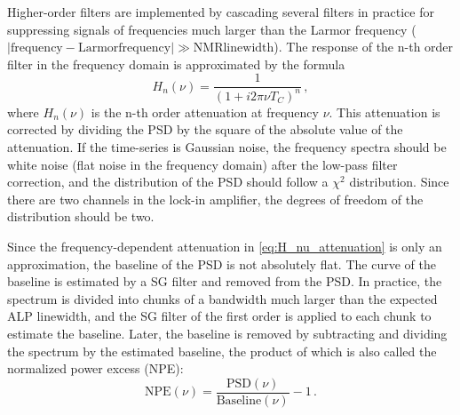 Higher-order filters are implemented by cascading several filters in practice for suppressing signals of frequencies much larger than the Larmor frequency ($|\mathrm{frequency}-\mathrm{Larmor frequency}|\gg\mathrm{NMR linewidth}$).   
The response of the n-th order filter in the frequency domain is approximated by the formula
\begin{equation}
    H_n(\nu)=\frac{1}{(1+i2\pi\nu T_C)^n} \,,
    \label{eq:H_nu_attenuation}
\end{equation}
where $H_n(\nu)$ is the n-th order attenuation at frequency $\nu$. 
This attenuation is corrected by dividing the PSD by the square of the absolute value of the attenuation.
If the time-series is Gaussian noise, the frequency spectra should be white noise (flat noise in the frequency domain) after the low-pass filter correction, and the distribution of the PSD should follow a $\chi^2$ distribution. Since there are two channels in the lock-in amplifier, the degrees of freedom of the distribution should be two.

Since the frequency-dependent attenuation in \eqref{eq:H_nu_attenuation} is only an approximation, the baseline of the PSD is not absolutely flat. 
The curve of the baseline is estimated by a SG filter and removed from the PSD.
In practice, the spectrum is divided into chunks of a bandwidth much larger than the expected ALP linewidth, and the SG filter of the first order is applied to each chunk to estimate the baseline. 
Later, the baseline is removed by subtracting and dividing the spectrum by the estimated baseline, the product of which is also called the normalized power excess (NPE):
\[
  \mathrm{NPE}(\nu) = \frac{\mathrm{PSD}(\nu)}{\mathrm{Baseline}(\nu)} - 1\,.
  \label{eq:NPE_baseline}
\]



